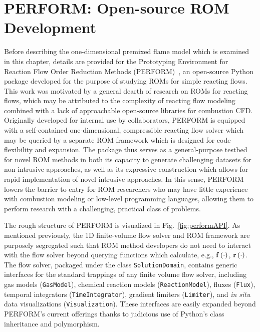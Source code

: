 \section{PERFORM: Open-source ROM Development}

Before describing the one-dimensional premixed flame model which is examined in this chapter, details are provided for the Prototyping Environment for Reaction Flow Order Reduction Methods (PERFORM)~\cite{Wentland2022}, an open-source Python package developed for the purpose of studying ROMs for simple reacting flows. This work was motivated by a general dearth of research on ROMs for reacting flows, which may be attributed to the complexity of reacting flow modeling combined with a lack of approachable open-source libraries for combustion CFD. Originally developed for internal use by collaborators, PERFORM is equipped with a self-contained one-dimensional, compressible reacting flow solver which may be queried by a separate ROM framework which is designed for code flexibility and expansion. The package thus serves as a general-purpose testbed for novel ROM methods in both its capacity to generate challenging datasets for non-intrusive approaches, as well as its expressive construction which allows for rapid implementation of novel intrusive approaches.  In this sense, PERFORM lowers the barrier to entry for ROM researchers who may have little experience with combustion modeling or low-level programming languages, allowing them to perform research with a challenging, practical class of problems.

The rough structure of PERFORM is visualized in Fig.~\ref{fig:performAPI}. As mentioned previously, the 1D finite-volume flow solver and ROM framework are purposely segregated such that ROM method developers do not need to interact with the flow solver beyond querying functions which calculate, e.g., $\mathbf{f} \left(\cdot\right)$, $\mathbf{r}\left(\cdot\right)$. The flow solver, packaged under the class \texttt{SolutionDomain}, contains generic interfaces for the standard trappings of any finite volume flow solver, including gas models (\texttt{GasModel}), chemical reaction models (\texttt{ReactionModel}), fluxes (\texttt{Flux}), temporal integrators (\texttt{TimeIntegrator}), gradient limiters (\texttt{Limiter}), and \textit{in situ} data visualizations (\texttt{Visualization}). These interfaces are easily expanded beyond PERFORM's current offerings thanks to judicious use of Python's class inheritance and polymorphism.

